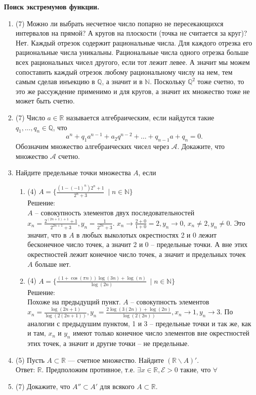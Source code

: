 \documentclass[a4paper]{article}
\begin{document}
\noindent\textbf{Поиск экстремумов функции.}

\begin{enumerate}
	\item (7) Можно ли выбрать несчетное число попарно не пересекающихся интервалов на прямой? А кругов на плоскости (точка не считается за круг)?\\
Нет. Каждый отрезок содержит рациональные числа. Для каждого отрезка его рациональные числа уникальны. Рациональные числа одного отрезка больше всех рациональных чисел другого, если тот лежит левее. А значит мы можем сопоставить каждый отрезок любому рациональному числу на нем, тем самым сделав инъекцию в $\mathbb Q$, а значит и в $\mathbb N$. Поскольку $\mathbb Q^2$ тоже счетно, то это же рассуждение применимо и для кругов, а значит их множество тоже не может быть счетно. 
	\item (7) Число $a\in \mathbb R$ называется алгебраическим, если найдутся такие $q_1,\dots,q_n\in \mathbb Q$, что
	\[
	    a^n + q_1a^{n-1} + a_2q^{n-2} + \dots + q_{n-1}a + q_n = 0.
	\]
	Обозначим множество алгебраических чисел через $\mathcal{A}$. Докажите, что множество $\mathcal{A}$ счетно.
	
	\item Найдите предельные точки множества $A$, если
	\begin{enumerate}
	    \item (4) $A = \{\frac{(1 - (-1)^n)2^n + 1}{2^n + 3}\ \mid n\in \mathbb N\}$\\
    Решение:\\
        $A$ -- совокупность элементов двух последовательностей $x_n = \frac{2^{(2n + 1)+1} + 1}{2^{2n+1} + 3}, y_n = \frac{1}{2^{2n} + 3}$. $x_n \rightarrow \frac{2 + 0}{1 + 0} = 2, y_n \rightarrow 0$, $x_n \neq 2, y_n \neq 0$. Это значит, что в $A$ в любых выколотых окрестностях 2 и 0 лежит бесконечное число точек, а значит 2 и 0 -- предельные точки. А вне этих окрестностей лежит конечное число точек, а значит и предельных точек $A$ больше нет.
        \item (4) $A = \{\frac{(1 + \cos (\pi n)) \log (3n) + \log(n)}{\log (2n)}\ \mid n\in \mathbb N\}$\\
    Решение:\\
    Похоже на предыдущий пункт. $A$ -- совокупность элементов $x_n = \frac{\log(2n+1)}{\log(2(2n+1))}, y_n = \frac{2\log(3(2n)) + \log(2n)}{\log(2(2n))}, x_n \rightarrow 1, y_n \rightarrow 3$. По аналогии с предыдушим пунктом, 1 и 3 -- предельные точки и так же, как и там, $x_n$ и $y_n$ имеют только конечное число элементов вне окрестностей этих точек, а значит и другие точки -- не предельные.
	\end{enumerate}
	
	\item (5) Пусть $A\subset \mathbb R$ --- счетное множество. Найдите $(\mathbb R\smallsetminus A)'$.\\
Ответ: $\mathbb R$. Предположим противное, т.е. $\exists x \in \mathbb R, \mathcal{E} > 0$ такие, что $\forall $
	\item (7) Докажите, что $A''\subset A'$ для всякого $A\subset \mathbb R$.
\end{enumerate}
\end{document}

